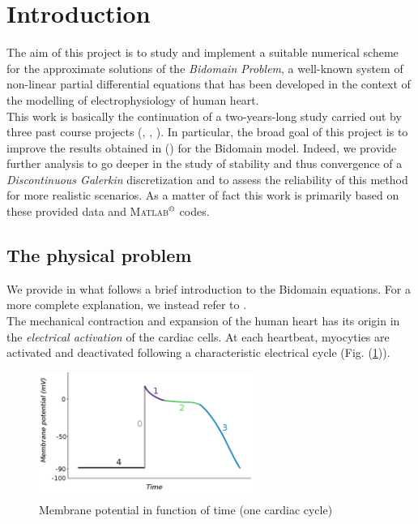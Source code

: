 \documentclass[a4paper,11pt]{article}
\begin{document}
    \section{Introduction}
    The aim of this project is to study and implement a suitable numerical scheme for the approximate solutions of the \emph{Bidomain Problem}, a well-known system of non-linear partial differential equations that has been developed in the context of the modelling of electrophysiology of human heart. \\
    This work is basically the continuation of a two-years-long study carried out by three past course projects (\cite{bagnara}, \cite{andreotti}, \cite{marta}). In particular, the broad goal of this project is to improve the results obtained in \parencite{marta} (\citeauthor{marta}) for the Bidomain model. Indeed, we provide further analysis to go deeper in the study of stability and thus convergence of a \emph{Discontinuous Galerkin} discretization and to assess the reliability of this method for more realistic scenarios. As a matter of fact this work is primarily based on these provided data and \textsc{Matlab}$^ \copyright$ codes.
    
    \subsection{The physical problem}
    We provide in what follows a brief introduction to the Bidomain equations. For a more complete explanation, we instead refer to \cite{acta}.\\
    The mechanical contraction and expansion of the human heart has its origin in the \emph{electrical activation} of the cardiac cells. At each heartbeat, myocyties are activated and deactivated following a characteristic electrical cycle (Fig. (\ref{potential_cycle})). 
    
    
    \begin{figure}[h]
    \begin{center}
    \includegraphics[width = 7cm]{./potential_cycle.png}
    \caption{Membrane potential in function of time (one cardiac cycle)}
    \label{potential_cycle}
    \end{center}
    \end{figure}
    
\end{document}
